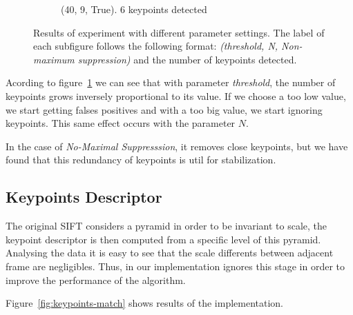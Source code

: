 \begin{figure}[h!]
\begin{subfigure}{0.5\textwidth}
  \caption{(40, 9, True). 6 keypoints detected}
\end{subfigure}
 \caption{Results of experiment with different parameter settings. The label of each subfigure follows the following format: \textit{(threshold, N, Non-maximum suppression)} and the number of keypoints detected.}
\label{fig:keypoints}
\end{figure}

Acording to figure~\ref{fig:keypoints} we can see that with parameter \textit{threshold}, the number of keypoints grows inversely proportional to its value. If we choose a too low value, we start getting falses positives and with a too big value, we start ignoring keypoints. This same effect occurs with the parameter $N$.

In the case of \textit{No-Maximal Suppresssion}, it removes close keypoints, but we have found that this redundancy of keypoints is util for stabilization.


\subsection{Keypoints Descriptor}

The original SIFT considers a pyramid in order to be invariant to scale, the keypoint descriptor is then computed from a specific level of this pyramid. Analysing the data it is easy to see that the scale differents between adjacent frame are negligibles. Thus, in our implementation ignores this stage in order to improve the performance of the algorithm.

Figure~\ref{fig:keypoints-match} shows results of the implementation.

